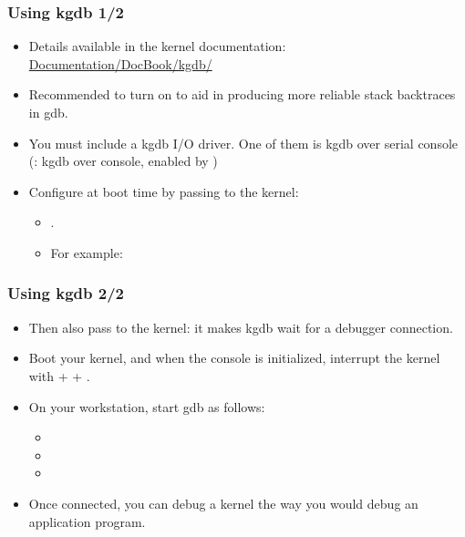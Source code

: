 \begin{frame}
  \frametitle{Using kgdb 1/2}
  \begin{itemize}
  \item Details available in the kernel documentation:
    \href{http://free-electrons.com/kerneldoc/latest/DocBook/kgdb/}
         {Documentation/DocBook/kgdb/}
  \item Recommended to turn on  to aid in
    producing more reliable stack backtraces in gdb.
  \item You must include a kgdb I/O driver. One of them is kgdb over
    serial console (: kgdb over console, enabled by
    )
  \item Configure  at boot time by passing to the kernel:
    \begin{itemize}
    \item {}.
    \item For example: 
    \end{itemize}
  \end{itemize}
\end{frame}

\begin{frame}
  \frametitle{Using kgdb 2/2}
  \begin{itemize}
  \item Then also pass  to the kernel: it makes kgdb
    wait for a debugger connection.
  \item Boot your kernel, and when the console is initialized,
    interrupt the kernel with  +  + .
  \item On your workstation, start gdb as follows:
    \begin{itemize}
    \item {}
    \item {}
    \item {}
    \end{itemize}
  \item Once connected, you can debug a kernel the way you would debug
    an application program.
  \end{itemize}
\end{frame}

